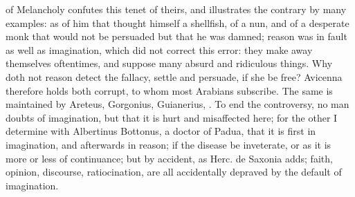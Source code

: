 {of Melancholy confutes this tenet of theirs, and illustrates the
contrary by many examples: as of him that thought himself a shellfish,
of a nun, and of a desperate monk that would not be persuaded but that
he was damned; reason was in fault as well as imagination, which did
not correct this error: they make away themselves oftentimes, and
suppose many absurd and ridiculous things. Why doth not reason detect
the fallacy, settle and persuade, if she be free? Avicenna
therefore holds both corrupt, to whom most Arabians subscribe. The same
is maintained by Areteus, Gorgonius, Guianerius, \etc{}. To end
the controversy, no man doubts of imagination, but that it is hurt and
misaffected here; for the other I determine with  Albertinus
Bottonus, a doctor of Padua, that it is first in imagination, and
afterwards in reason; if the disease be inveterate, or as it is more or
less of continuance; but by accident, as Herc. de Saxonia adds;
faith, opinion, discourse, ratiocination, are all accidentally depraved
by the default of imagination.
}
